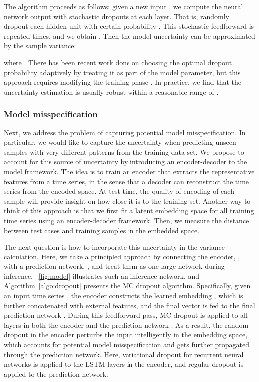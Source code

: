\documentclass[conference,compsoc,final]{IEEEtran}
\begin{document}
The algorithm proceeds as follows: given a new input , we compute the neural network output with stochastic dropouts at each layer. That is, randomly dropout each hidden unit with certain probability . This stochastic feedforward is repeated  times, and we obtain . Then the model uncertainty can be approximated by the sample variance: 

where  \cite{gal2016dropout}.
There has been recent work done on choosing the optimal dropout probability  adaptively by treating it as part of the model parameter, but this approach requires modifying the training phase \cite{gal2017concrete}. In practice, we find that the uncertainty estimation is usually robust within a reasonable range of . 


\subsubsection{Model misspecification}
Next, we address the problem of capturing potential model misspecification. In particular, we would like to capture the uncertainty when predicting unseen samples with very different patterns from the training data set. We propose to account for this source of uncertainty by introducing an encoder-decoder to the model framework. The idea is to train an encoder that extracts the representative features from a time series, in the sense that a decoder can reconstruct the time series from the encoded space. At test time, the quality of encoding of each sample will provide insight on how close it is to the training set. Another way to think of this approach is that we first fit a latent embedding space for all training time series using an encoder-decoder framework. Then, we measure the distance between test cases and training samples in the embedded space.

The next question is how to incorporate this uncertainty in the variance calculation. Here, we take a principled approach by connecting the encoder, , with a prediction network, , and treat them as one large network  during inference. \figurename~\ref{fig:model} illustrates such an inference network, and Algorithm~\ref{algo:dropout} presents the MC dropout algorithm. Specifically, given an input time series , the encoder  constructs the learned embedding , which is further concatenated with external features, and the final vector is fed to the final prediction network . During this feedforward pass, MC dropout is applied to all layers in both the encoder  and the prediction network . As a result, the random dropout in the encoder perturbs the input intelligently in the embedding space, which accounts for potential model misspecification and gets further propagated through the prediction network. Here, variational dropout for recurrent neural networks \cite{Gal2015Theoretically} is applied to the LSTM layers in the encoder, and regular dropout \cite{gal2016dropout} is applied to the prediction network. 
\end{document}
